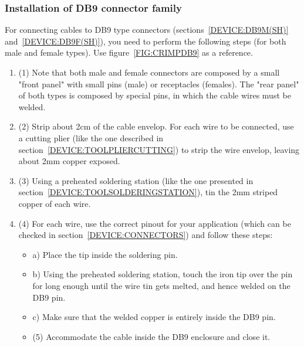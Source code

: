 \subsubsection{Installation of DB9 connector family} \label{CRIMPINGDB9}
For connecting cables to DB9 type connectors (sections~\ref{DEVICE:DB9M(SH)} and~\ref{DEVICE:DB9F(SH)}), you need to perform the following steps (for both male and female types). Use figure~\ref{FIG:CRIMPDB9} as a reference.
\begin{enumerate}
  \item (1) Note that both male and female connectors are composed by a small "front panel" with small pins (male) or receptacles (females). The "rear panel" of both types is composed by special pins, in which the cable wires must be welded.
  \item (2) Strip about 2cm of the cable envelop. For each wire to be connected, use a cutting plier (like the one described in section~\ref{DEVICE:TOOLPLIERCUTTING}) to strip the wire envelop, leaving about 2mm copper exposed.
  \item (3) Using a preheated soldering station (like the one presented in section~\ref{DEVICE:TOOLSOLDERINGSTATION}), tin the 2mm striped copper of each wire.
  \item (4) For each wire, use the correct pinout for your application (which can be checked in section~\ref{DEVICE:CONNECTORS}) and follow these steps:
  \begin{itemize}
    \item a) Place the tip inside the soldering pin.
    \item b) Using the preheated soldering station, touch the iron tip over the pin for long enough until the wire tin gets melted, and hence welded on the DB9 pin.
    \item c) Make sure that the welded copper is entirely inside the DB9 pin.
  \item (5) Accommodate the cable inside the DB9 enclosure and close it.
  \end{itemize}
\end{enumerate}
